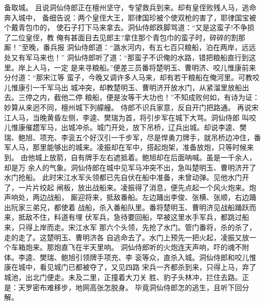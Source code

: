 备取城。
且说洞仙侍郎正在檀州坚守，专望救兵到来。却有皇侄败残人马，逃命奔入城中，
备细告说：两个皇侄大王，耶律国珍被个使双枪的害了，耶律国宝被个戴青包巾的，
使石子打下马来拿去。洞仙侍郎跌脚骂道：“又是这蛮子!不争损了二位皇侄，教
俺有甚面目去见郎主?拿住那个青包巾的蛮子时，碎碎的割那厮！”至晚，番兵报
洞仙侍郎道：“潞水河内，有五七百只粮船，泊在两岸，远远处又有军马来也！”
洞仙侍郎听了道：“那蛮子不识俺的水路，错把粮船直行到这里。岸上人马，一定
是来寻粮船。”便差三员番将楚明玉、曹明济、咬儿惟康前来分付道：“那宋江等
蛮子，今晚又调许多人马来，却有若干粮船在俺河里。可教咬儿惟康引一千军马出
城冲突，却教楚明玉、曹明济开放水门，从紧溜里放船出去。三停之内，截他二停
粮船，便是汝等干大功也！”不知成败何如，有诗为证：
妙算从来迥不同，檀州城下列艨艟。
侍郎不识兵家意，反自开门把路通。
再说宋江人马，当晚黄昏左侧，李逵、樊瑞为首，将引步军在城下大骂。洞仙侍郎
叫咬儿惟康催趱军马，出城冲杀。城门开处，放下吊桥，辽兵出城。却说李逵、樊
瑞、鲍旭、项充、李衮五个好汉引一千步军，尽是悍勇刀牌手，就吊桥边冲住，番
军人马，那里能够出的城来。凌振却在军中，搭起炮架，准备放炮，只等时候来到。
由他城上放箭，自有牌手左右遮抵着。鲍旭却在后面呐喊。虽是一千余人，却是万
余人的气象。洞仙侍郎在城中见军马冲突不出，急叫楚明玉、曹明济开了水门抢船。
此时宋江水军头领都已先自伏在船中准备，未曾动弹。见他水门开了，一片片绞起
闸板，放出战船来。凌振得了消息，便先点起一个风火炮来。炮声响处，两边战船，
厮迎将来，抵敌番船。左边踊出李俊、张横、张顺，右边踊出阮家三弟兄，都使着
战船，杀入番船队里。番将楚明玉、曹明济见战船踊跃而来，抵敌不住，料道有埋
伏军兵，急待要回船，早被这里水手军兵，都跳过船来，只得上岸而走。宋江水军
那六个头领，先抢了水门。管门番将，杀的杀了，走的走了。这楚明玉、曹明济各
自逃命去了。水门上预先一把火起，凌振又放一个车箱炮来。那炮直飞在半天里响。
洞仙侍郎听的火炮连天声响，吓的魂不附体。李逵、樊瑞、鲍旭引领牌手项充、李
衮等众，直杀入城。洞仙侍郎和咬儿惟康在城中，看见城门已都被夺了，又见四路
宋兵一齐都杀到来，只得上马，弃了城池，出北门便走。未及二里，正撞着大刀关
胜、豹子头林冲，拦住去路。正是：天罗密布难移步，地网高张怎脱身。
毕竟洞仙侍郎怎的逃生，且听下回分解。